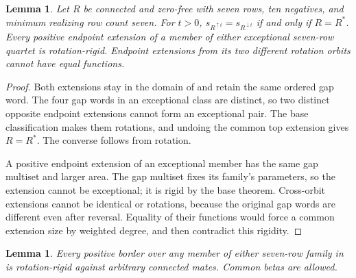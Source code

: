 \documentclass[11pt,a4paper]{amsart}
\numberwithin{equation}{section}
\theoremstyle{plain}
\newtheorem{lemma}[theorem]{Lemma}
\theoremstyle{definition}
\begin{document}
\begin{lemma}\label{lem:ten-negative-endpoints}
Let \(R\) be connected and zero-free with seven rows, ten negatives,
and minimum realizing row count seven.  For \(t>0\),
\(s_{R^{\uparrow t}}=s_{R^{\downarrow t}}\) if and only if \(R=R^*\).
Every positive endpoint extension of a member of either exceptional
seven-row quartet is rotation-rigid.  Endpoint extensions from its two
different rotation orbits cannot have equal functions.
\end{lemma}

\begin{proof}
Both extensions stay in the domain of 
and retain the same ordered gap word.  The four gap words in an
exceptional class are distinct, so two distinct opposite endpoint
extensions cannot form an exceptional pair.  The base classification
makes them rotations, and undoing the common top extension gives
\(R=R^*\).  The converse follows from rotation.

A positive endpoint extension of an exceptional member has the same gap
multiset and larger area.  The gap multiset fixes its family's parameters,
so the extension cannot be exceptional; it is rigid by the base theorem.
Cross-orbit extensions cannot be identical or rotations, because the
original gap words are different even after reversal.  Equality of their
functions would force a common extension size by weighted degree, and
then contradict this rigidity.
\end{proof}

\begin{lemma}\label{lem:ten-negative-border-separation}
Every positive border over any member of either seven-row family in
 is rotation-rigid against arbitrary
connected mates.  Common betas are allowed.
\end{lemma}
\end{document}
